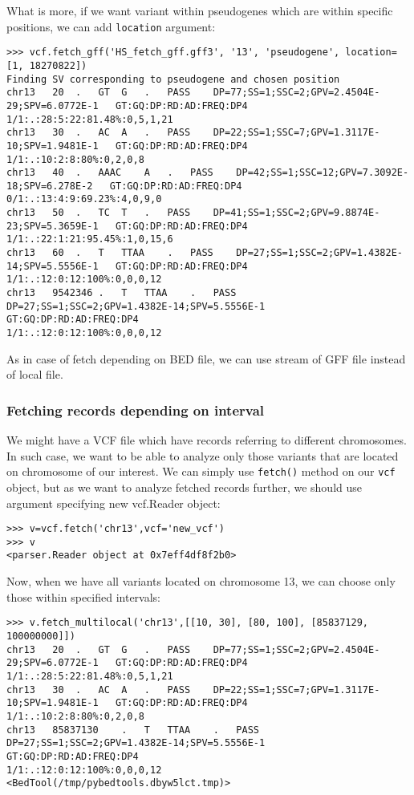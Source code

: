 \noindent What is more, if we want variant within pseudogenes which are within specific positions, we can add
\verb|location| argument:


\begin{verbatim}
>>> vcf.fetch_gff('HS_fetch_gff.gff3', '13', 'pseudogene', location=[1, 18270822])
Finding SV corresponding to pseudogene and chosen position
chr13	20	.	GT	G	.	PASS	DP=77;SS=1;SSC=2;GPV=2.4504E-29;SPV=6.0772E-1	GT:GQ:DP:RD:AD:FREQ:DP4
1/1:.:28:5:22:81.48%:0,5,1,21
chr13	30	.	AC	A	.	PASS	DP=22;SS=1;SSC=7;GPV=1.3117E-10;SPV=1.9481E-1	GT:GQ:DP:RD:AD:FREQ:DP4
1/1:.:10:2:8:80%:0,2,0,8
chr13	40	.	AAAC	A	.	PASS	DP=42;SS=1;SSC=12;GPV=7.3092E-18;SPV=6.278E-2	GT:GQ:DP:RD:AD:FREQ:DP4
0/1:.:13:4:9:69.23%:4,0,9,0
chr13	50	.	TC	T	.	PASS	DP=41;SS=1;SSC=2;GPV=9.8874E-23;SPV=5.3659E-1	GT:GQ:DP:RD:AD:FREQ:DP4
1/1:.:22:1:21:95.45%:1,0,15,6
chr13	60	.	T	TTAA	.	PASS	DP=27;SS=1;SSC=2;GPV=1.4382E-14;SPV=5.5556E-1	GT:GQ:DP:RD:AD:FREQ:DP4
1/1:.:12:0:12:100%:0,0,0,12
chr13	9542346	.	T	TTAA	.	PASS	DP=27;SS=1;SSC=2;GPV=1.4382E-14;SPV=5.5556E-1	GT:GQ:DP:RD:AD:FREQ:DP4
1/1:.:12:0:12:100%:0,0,0,12
\end{verbatim}


\noindent As in case of fetch depending on BED file, we can use stream of GFF file instead of local file.


\subsubsection{Fetching records depending on interval}


\noindent We might have a VCF file which have records referring to different chromosomes. In such case, we want to be able to
analyze only those variants that are located on chromosome of our interest. We can simply use \verb|fetch()| method
on our \verb|vcf| object, but as we want to analyze fetched records further, we should use argument specifying
new vcf.Reader object:


\begin{verbatim}
>>> v=vcf.fetch('chr13',vcf='new_vcf')
>>> v
<parser.Reader object at 0x7eff4df8f2b0>

\end{verbatim}

\noindent Now, when we have all variants located on chromosome 13, we can choose only those within specified intervals:


\begin{verbatim}
>>> v.fetch_multilocal('chr13',[[10, 30], [80, 100], [85837129, 100000000]])
chr13	20	.	GT	G	.	PASS	DP=77;SS=1;SSC=2;GPV=2.4504E-29;SPV=6.0772E-1	GT:GQ:DP:RD:AD:FREQ:DP4
1/1:.:28:5:22:81.48%:0,5,1,21
chr13	30	.	AC	A	.	PASS	DP=22;SS=1;SSC=7;GPV=1.3117E-10;SPV=1.9481E-1	GT:GQ:DP:RD:AD:FREQ:DP4
1/1:.:10:2:8:80%:0,2,0,8
chr13	85837130	.	T	TTAA	.	PASS	DP=27;SS=1;SSC=2;GPV=1.4382E-14;SPV=5.5556E-1	GT:GQ:DP:RD:AD:FREQ:DP4
1/1:.:12:0:12:100%:0,0,0,12
<BedTool(/tmp/pybedtools.dbyw5lct.tmp)>

\end{verbatim}

